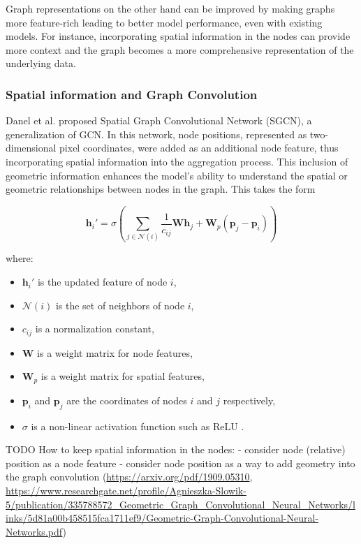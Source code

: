 Graph representations on the other hand can be improved by making graphs more feature-rich leading to better model performance, even with existing models. For instance, incorporating spatial information in the nodes can provide more context and the graph becomes a more comprehensive representation of the underlying data.


\subsubsection{Spatial information and Graph Convolution}
Danel et al. \cite{danel_spatial_2020} proposed Spatial Graph Convolutional Network (SGCN), a generalization of GCN. In this network, node positions, represented as two-dimensional pixel coordinates, were added as an additional node feature, thus incorporating spatial information into the aggregation process. This inclusion of geometric information enhances the model's ability to understand the spatial or geometric relationships between nodes in the graph. This takes the form 

\[
\mathbf{h}_i' = \sigma \left( \sum_{j \in \mathcal{N}(i)} \frac{1}{c_{ij}} \mathbf{W} \mathbf{h}_j + \mathbf{W}_p (\mathbf{p}_j - \mathbf{p}_i) \right)
\]

where:
\begin{itemize}
    \item \(\mathbf{h}_i'\) is the updated feature of node \(i\),
    \item \(\mathcal{N}(i)\) is the set of neighbors of node \(i\),
    \item \(c_{ij}\) is a normalization constant,
    \item \(\mathbf{W}\) is a weight matrix for node features,
    \item \(\mathbf{W}_p\) is a weight matrix for spatial features,
    \item \(\mathbf{p}_i\) and \(\mathbf{p}_j\) are the coordinates of nodes \(i\) and \(j\) respectively,
    \item \(\sigma\) is a non-linear activation function such as ReLU \cite{danel_spatial_2020}.
\end{itemize}


TODO
How to keep spatial information in the nodes:
- consider node (relative) position as a node feature
- consider node position as a way to add geometry into the graph convolution (\url{https://arxiv.org/pdf/1909.05310}, \url{https://www.researchgate.net/profile/Agnieszka-Slowik-5/publication/335788572_Geometric_Graph_Convolutional_Neural_Networks/links/5d81a00b458515fca1711ef9/Geometric-Graph-Convolutional-Neural-Networks.pdf})


%